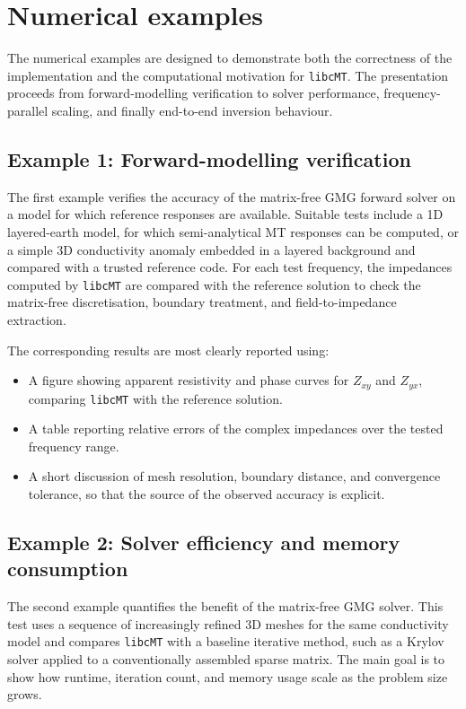 \documentclass{article}
\begin{document}
\section{Numerical examples}

The numerical examples are designed to demonstrate both the correctness of the implementation and the computational motivation for \texttt{libcMT}. The presentation proceeds from forward-modelling verification to solver performance, frequency-parallel scaling, and finally end-to-end inversion behaviour.

\subsection{Example 1: Forward-modelling verification}

The first example verifies the accuracy of the matrix-free GMG forward solver on a model for which reference responses are available. Suitable tests include a 1D layered-earth model, for which semi-analytical MT responses can be computed, or a simple 3D conductivity anomaly embedded in a layered background and compared with a trusted reference code. For each test frequency, the impedances computed by \texttt{libcMT} are compared with the reference solution to check the matrix-free discretisation, boundary treatment, and field-to-impedance extraction.

The corresponding results are most clearly reported using:
\begin{itemize}
  \item A figure showing apparent resistivity and phase curves for $Z_{xy}$ and $Z_{yx}$, comparing \texttt{libcMT} with the reference solution.
  \item A table reporting relative errors of the complex impedances over the tested frequency range.
  \item A short discussion of mesh resolution, boundary distance, and convergence tolerance, so that the source of the observed accuracy is explicit.
\end{itemize}

\subsection{Example 2: Solver efficiency and memory consumption}

The second example quantifies the benefit of the matrix-free GMG solver. This test uses a sequence of increasingly refined 3D meshes for the same conductivity model and compares \texttt{libcMT} with a baseline iterative method, such as a Krylov solver applied to a conventionally assembled sparse matrix. The main goal is to show how runtime, iteration count, and memory usage scale as the problem size grows.
\end{document}
